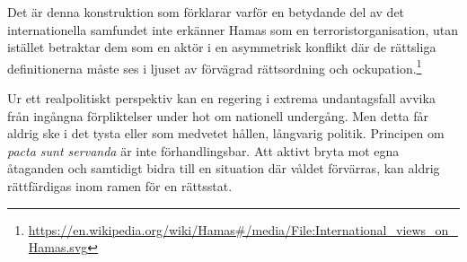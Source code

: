 

Det är denna konstruktion som förklarar varför en betydande del av det internationella samfundet inte erkänner Hamas som en terroristorganisation, utan istället betraktar dem som en aktör i en asymmetrisk konflikt där de rättsliga definitionerna måste ses i ljuset av förvägrad rättsordning och ockupation.\footnote{\url{https://en.wikipedia.org/wiki/Hamas\#/media/File:International_views_on_Hamas.svg}}

Ur ett realpolitiskt perspektiv kan en regering i extrema undantagsfall avvika från ingångna förpliktelser under hot om nationell undergång. Men detta får aldrig ske i det tysta eller som medvetet hållen, långvarig politik. Principen om \textit{pacta sunt servanda} är inte förhandlingsbar. Att aktivt bryta mot egna åtaganden och samtidigt bidra till en situation där våldet förvärras, kan aldrig rättfärdigas inom ramen för en rättsstat.

